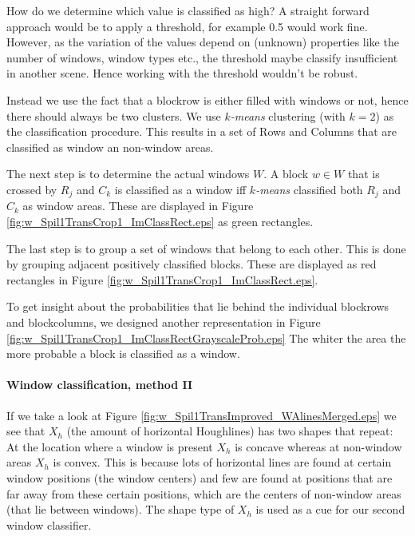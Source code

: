 How do we determine which value is classified as high?  A straight forward
approach would be to apply a threshold, for example 0.5 would work fine.
However, as the variation of the values depend on (unknown) properties like the
number of windows, window types etc., the threshold maybe classify insufficient
in another scene.  Hence working with the threshold wouldn't be robust. 

Instead we use the fact that a blockrow is either filled with windows or not, hence
there should always be two clusters.  We use \emph{$k$-means} clustering (with
$k=2$) as the classification procedure.
This results in a set of Rows and Columns that are classified as window an
non-window areas.

The next step is to determine the actual windows $W$.
A block $w\in W$ that is crossed by $R_j$ and $C_k$ is classified as a
window iff \emph{$k$-means} classified both $R_j$ and $C_k$ as window areas. These are displayed in 
 Figure \ref{fig:w_Spil1TransCrop1_ImClassRect.eps} as green rectangles.

The last step is to group a set of windows that belong to each other. This is done by 
grouping adjacent positively classified blocks. These are displayed as red
rectangles in Figure \ref{fig:w_Spil1TransCrop1_ImClassRect.eps}.


To get insight about the probabilities that lie behind the individual blockrows and blockcolumns,
we designed another representation in Figure \ref{fig:w_Spil1TransCrop1_ImClassRectGrayscaleProb.eps}
The whiter the area the more probable a block is classified as a window.

\paragraph{Window classification, method II}
If we take a look at Figure \ref{fig:w_Spil1TransImproved_WAlinesMerged.eps}
we see that $X_h$ (the amount of horizontal Houghlines) has two shapes that
repeat:  At the location where a window is present $X_h$ is concave whereas at
non-window areas $X_h$ is convex. This is because lots of
horizontal lines are found at certain window positions (the window centers) and few
are found at positions that are far away from these certain positions, which are the
centers of non-window areas (that lie between windows).  The shape type of $X_h$ is
used as a cue for our second window classifier.\\

